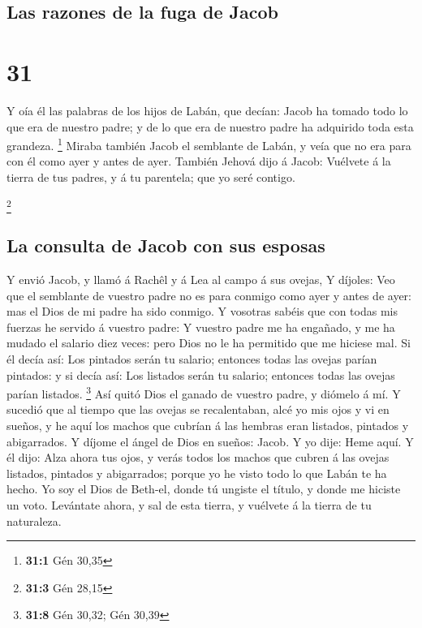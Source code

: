 \hypertarget{las-razones-de-la-fuga-de-jacob}{%
\subsection{Las razones de la fuga de
Jacob}\label{las-razones-de-la-fuga-de-jacob}}

\hypertarget{section-30}{%
\section{31}\label{section-30}}

 Y oía él las palabras de los hijos de Labán, que decían:
Jacob ha tomado todo lo que era de nuestro padre; y de lo que era de
nuestro padre ha adquirido toda esta grandeza. \footnote{\textbf{31:1}
  Gén 30,35}  Miraba también Jacob el semblante de Labán, y
veía que no era para con él como ayer y antes de ayer. 
También Jehová dijo á Jacob: Vuélvete á la tierra de tus padres, y á tu
parentela; que yo seré contigo.

\footnote{\textbf{31:3} Gén 28,15}

\hypertarget{la-consulta-de-jacob-con-sus-esposas}{%
\subsection{La consulta de Jacob con sus
esposas}\label{la-consulta-de-jacob-con-sus-esposas}}

 Y envió Jacob, y llamó á Rachêl y á Lea al campo á sus
ovejas,  Y díjoles: Veo que el semblante de vuestro padre no
es para conmigo como ayer y antes de ayer: mas el Dios de mi padre ha
sido conmigo.  Y vosotras sabéis que con todas mis fuerzas
he servido á vuestro padre:  Y vuestro padre me ha engañado,
y me ha mudado el salario diez veces: pero Dios no le ha permitido que
me hiciese mal.  Si él decía así: Los pintados serán tu
salario; entonces todas las ovejas parían pintados: y si decía así: Los
listados serán tu salario; entonces todas las ovejas parían listados.
\footnote{\textbf{31:8} Gén 30,32; Gén 30,39}  Así quitó
Dios el ganado de vuestro padre, y diómelo á mí.  Y sucedió
que al tiempo que las ovejas se recalentaban, alcé yo mis ojos y vi en
sueños, y he aquí los machos que cubrían á las hembras eran listados,
pintados y abigarrados.  Y díjome el ángel de Dios en
sueños: Jacob. Y yo dije: Heme aquí.  Y él dijo: Alza ahora
tus ojos, y verás todos los machos que cubren á las ovejas listados,
pintados y abigarrados; porque yo he visto todo lo que Labán te ha
hecho.  Yo soy el Dios de Beth-el, donde tú ungiste el
título, y donde me hiciste un voto. Levántate ahora, y sal de esta
tierra, y vuélvete á la tierra de tu naturaleza.


